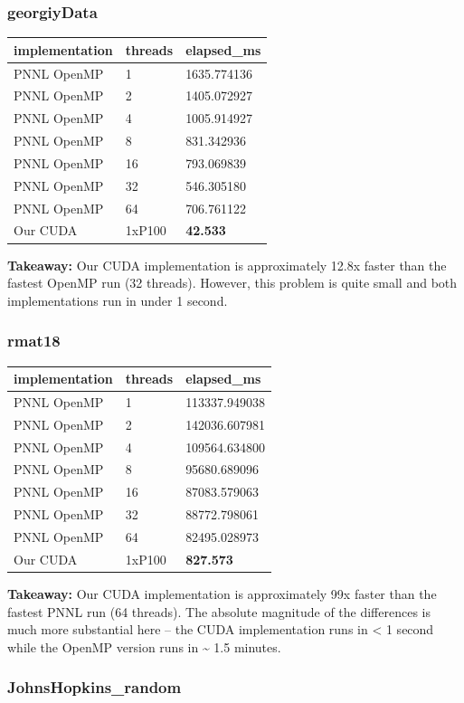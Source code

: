 \documentclass[10pt,oneside]{memoir}
\begin{document}
\hypertarget{georgiydata-1}{%
\subsubsection{georgiyData}\label{georgiydata-1}}

\begin{longtable}[]{@{}lll@{}}
\toprule
implementation & threads & elapsed\_ms\tabularnewline
\midrule
\endhead
PNNL OpenMP & 1 & 1635.774136\tabularnewline
PNNL OpenMP & 2 & 1405.072927\tabularnewline
PNNL OpenMP & 4 & 1005.914927\tabularnewline
PNNL OpenMP & 8 & 831.342936\tabularnewline
PNNL OpenMP & 16 & 793.069839\tabularnewline
PNNL OpenMP & 32 & 546.305180\tabularnewline
PNNL OpenMP & 64 & 706.761122\tabularnewline
Our CUDA & 1xP100 & \textbf{42.533}\tabularnewline
\bottomrule
\end{longtable}

\textbf{Takeaway:} Our CUDA implementation is approximately 12.8x faster
than the fastest OpenMP run (32 threads). However, this problem is quite
small and both implementations run in under 1 second.

\hypertarget{rmat18-1}{%
\subsubsection{rmat18}\label{rmat18-1}}

\begin{longtable}[]{@{}lll@{}}
\toprule
implementation & threads & elapsed\_ms\tabularnewline
\midrule
\endhead
PNNL OpenMP & 1 & 113337.949038\tabularnewline
PNNL OpenMP & 2 & 142036.607981\tabularnewline
PNNL OpenMP & 4 & 109564.634800\tabularnewline
PNNL OpenMP & 8 & 95680.689096\tabularnewline
PNNL OpenMP & 16 & 87083.579063\tabularnewline
PNNL OpenMP & 32 & 88772.798061\tabularnewline
PNNL OpenMP & 64 & 82495.028973\tabularnewline
Our CUDA & 1xP100 & \textbf{827.573}\tabularnewline
\bottomrule
\end{longtable}

\textbf{Takeaway:} Our CUDA implementation is approximately 99x faster
than the fastest PNNL run (64 threads). The absolute magnitude of the
differences is much more substantial here -- the CUDA implementation
runs in \textless{} 1 second while the OpenMP version runs in
\textasciitilde{} 1.5 minutes.

\hypertarget{johnshopkins_random-1}{%
\subsubsection{JohnsHopkins\_random}\label{johnshopkins_random-1}}
\end{document}
